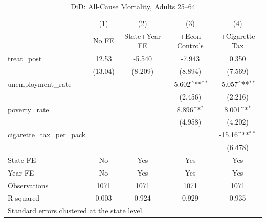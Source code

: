 \begin{table}[htbp]\centering
\def\sym#1{\ifmmode^{#1}\else\(^{#1}\)\fi}
\caption{DiD: All-Cause Mortality, Adults 25--64}
\begin{tabular}{l*{4}{c}}
\toprule
                    &\multicolumn{1}{c}{(1)}&\multicolumn{1}{c}{(2)}&\multicolumn{1}{c}{(3)}&\multicolumn{1}{c}{(4)}\\
                    &\multicolumn{1}{c}{No FE}&\multicolumn{1}{c}{State+Year FE}&\multicolumn{1}{c}{+Econ Controls}&\multicolumn{1}{c}{+Cigarette Tax}\\
\midrule
treat\_post          &       12.53         &      -5.540         &      -7.943         &       0.350         \\
                    &     (13.04)         &     (8.209)         &     (8.894)         &     (7.569)         \\
\addlinespace
unemployment\_rate   &                     &                     &      -5.602\sym{**} &      -5.057\sym{**} \\
                    &                     &                     &     (2.456)         &     (2.216)         \\
\addlinespace
poverty\_rate        &                     &                     &       8.896\sym{*}  &       8.001\sym{*}  \\
                    &                     &                     &     (4.958)         &     (4.202)         \\
\addlinespace
cigarette\_tax\_per\_pack&                     &                     &                     &      -15.16\sym{**} \\
                    &                     &                     &                     &     (6.478)         \\
\midrule
State FE            &          No         &         Yes         &         Yes         &         Yes         \\
Year FE             &          No         &         Yes         &         Yes         &         Yes         \\
Observations        &        1071         &        1071         &        1071         &        1071         \\
R-squared           &       0.003         &       0.924         &       0.929         &       0.935         \\
\bottomrule
\multicolumn{5}{l}{\footnotesize Standard errors clustered at the state level.}\\
\end{tabular}
\end{table}
